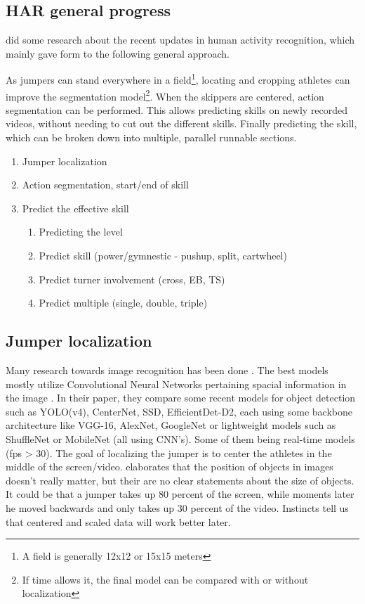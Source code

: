 \subsection{HAR general progress}

\textcite{Pareek_2020} did some research about the recent updates in human activity recognition, which mainly gave form to the following general approach.

As jumpers can stand everywhere in a field\footnote{A field is generally 12x12 or 15x15 meters}, locating and cropping athletes can improve the segmentation model\footnote{If time allows it, the final model can be compared with or without localization}. When the skippers are centered, action segmentation can be performed. This allows predicting skills on newly recorded videos, without needing to cut out the different skills. Finally predicting the skill, which can be broken down into multiple, parallel runnable sections.

\begin{enumerate}
    \item Jumper localization
    \item Action segmentation, start/end of skill
    \item Predict the effective skill
    \begin{enumerate}
        \item Predicting the level
        \item Predict skill (power/gymnestic - pushup, split, cartwheel)
        \item Predict turner involvement (cross, EB, TS)
        \item Predict multiple (single, double, triple)
    \end{enumerate}
\end{enumerate}

\subsection{Jumper localization}
\label{subsec:jumper localization}

Many research towards image recognition has been done \autocite{Zou_2023}. The best models mostly utilize Convolutional Neural Networks pertaining spacial information in the image \autocite{Zaidi_2021}. In their paper, they compare some recent models for object detection such as YOLO(v4), CenterNet, SSD, EfficientDet-D2, each using some backbone architecture like VGG-16, AlexNet, GoogleNet or lightweight models such as ShuffleNet or MobileNet (all using CNN's). Some of them being real-time models (fps > 30).
The goal of localizing the jumper is to center the athletes in the middle of the screen/video. \textcite{Bharadiya_2023} elaborates that the position of objects in images doesn't really matter, but their are no clear statements about the size of objects. It could be that a jumper takes up 80 percent of the screen, while moments later he moved backwards and only takes up 30 percent of the video. Instincts tell us that centered and scaled data will work better later.

